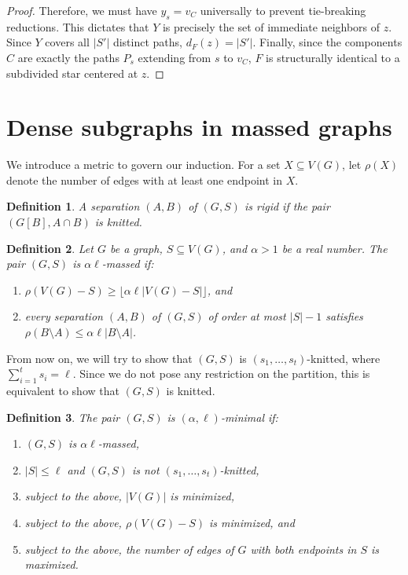 \documentclass[11pt]{amsart}
\newtheorem{definition}{Definition}
\begin{document}
\begin{proof}
Therefore, we must have $y_s = v_C$ universally to prevent tie-breaking reductions. This dictates that $Y$ is precisely the set of immediate neighbors of $z$. Since $Y$ covers all $|S'|$ distinct paths, $d_F(z) = |S'|$. Finally, since the components $C$ are exactly the paths $P_s$ extending from $s$ to $v_C$, $F$ is structurally identical to a subdivided star centered at $z$.
\end{proof}



\section{Dense subgraphs in massed graphs}\label{thm-4}

We introduce a metric to govern our induction. For a set $X\subseteq V(G)$, let $\rho(X)$ denote the number of edges with at least one endpoint in $X$.

\begin{definition}\label{rigid-separation}
A separation $(A, B)$ of $(G,S)$ is \emph{rigid} if the pair $(G[B], A\cap B)$ is knitted.
\end{definition}

\begin{definition}\label{mass}
Let $G$ be a graph, $S\subseteq V(G)$, and $\alpha>1$ be a real number. The pair $(G, S)$ is \emph{$\alpha \ell$-massed} if:
\begin{enumerate}
\item[(i)] $\rho(V(G)-S) \ge  \lfloor\alpha \ell |V(G)-S|\rfloor$, and
\item[(ii)] every separation $(A,B)$ of $(G,S)$ of order at most $|S|-1$ satisfies $\rho(B\setminus A) \le \alpha \ell |B\setminus A|$.
\end{enumerate}
\end{definition}

 From now on, we will try to show that $(G,S)$ is $(s_1, \ldots, s_t)$-knitted, where $\sum_{i=1}^t s_i=\ell$. Since we do not pose any restriction on the partition, this is equivalent to show that $(G,S)$ is knitted. 

\begin{definition}\label{minimal}
The pair $(G,S)$ is \emph{$(\alpha, \ell)$-minimal} if:
\begin{enumerate}
\item $(G,S)$ is $\alpha \ell$-massed, 
\item $|S|\le \ell$ and $(G,S)$ is not $(s_1, \ldots, s_t)$-knitted,
\item subject to the above, $|V(G)|$ is minimized,
\item subject to the above, $\rho(V(G)-S)$ is minimized, and
\item subject to the above, the number of edges of $G$ with both endpoints in $S$ is maximized.
\end{enumerate}
\end{definition}
\end{document}
